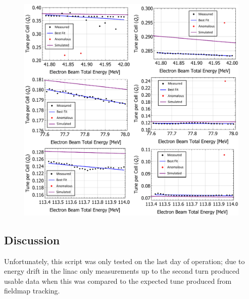 \documentclass[../main.tex]{subfiles}
\begin{document}
\begin{figure}[!h]
\centering
\includegraphics[width=\textwidth]{Figures/CBETA_Multi-Pass_Commissioning/ZX_analysed_3turn_tunes.pdf}
\caption{}
\label{fig:ZX_analysed_tunes}
\end{figure}

\subsection{Discussion}
\label{sec:chromaticity_discussion}

Unfortunately, this script was only tested on the last day of operation; due to energy drift in the linac only measurements
up to the second turn produced usable data when this was compared to the expected tune produced from fieldmap tracking.
\end{document}
